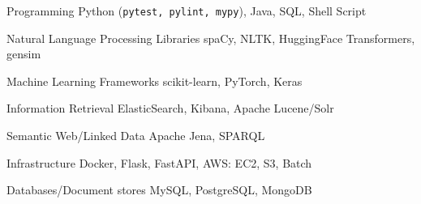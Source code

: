 

\begin{cvskills}

  \cvskill
    {Programming} %
    {Python (\texttt{pytest, pylint, mypy}), Java, SQL, Shell Script} %

  \cvskill
    {Natural Language Processing Libraries} %
    {spaCy, NLTK, HuggingFace Transformers, gensim} %

  \cvskill
    {Machine Learning Frameworks} %
    {scikit-learn, PyTorch, Keras} %

  \cvskill
    {Information Retrieval} %
    {ElasticSearch, Kibana, Apache Lucene/Solr} %

  \cvskill
    {Semantic Web/Linked Data} %
    {Apache Jena, SPARQL} %

  \cvskill
    {Infrastructure} %
    {Docker, Flask, FastAPI, AWS: EC2, S3, Batch} %

  \cvskill
    {Databases/Document stores} %
    {MySQL, PostgreSQL, MongoDB} %

\end{cvskills}
